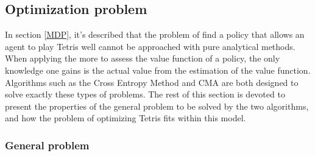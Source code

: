 \subsection{Optimization problem}

In section \ref{MDP}, it's described that the problem of
find a policy that allows an agent to play Tetris well
cannot be approached with pure analytical methods.
When applying the more%
to assess the value function of a policy, the only 
knowledge one gains is the actual value from the estimation 
of the value function. Algorithms such as the Cross Entropy Method
and CMA are both designed to solve exactly these types of problems.
The rest of this section is devoted to present the properties of the 
general problem to be solved by the two algorithms, and how the 
problem of optimizing Tetris fits within this model.

\subsubsection{General problem}


